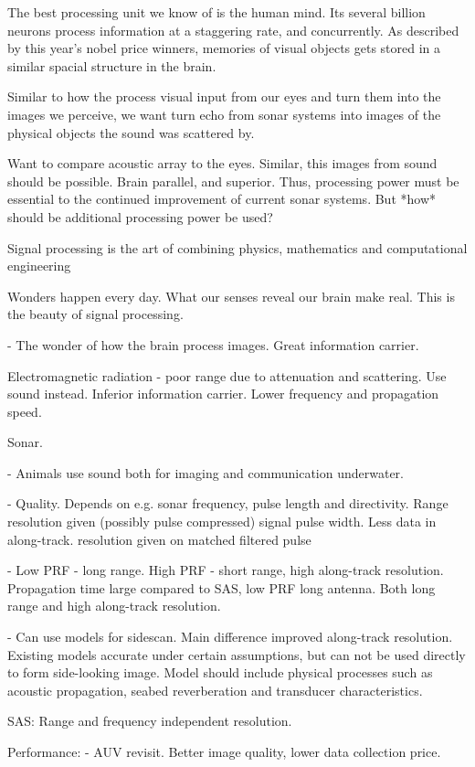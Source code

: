 
The best processing unit we know of is the human mind. Its several billion neurons process information at a staggering rate, and concurrently. As described by this year's nobel price winners, memories of visual objects gets stored in a similar spacial structure in the brain.  

Similar to how the process visual input from our eyes and turn them into the images we perceive, we want turn echo from sonar systems into images of the physical objects the sound was scattered by. 

Want to compare acoustic array to the eyes. Similar, this images from sound should be possible. Brain parallel, and superior. Thus, processing power must be essential to the continued improvement of current sonar systems. But *how* should be additional processing power be used?


Signal processing is the art of combining physics, mathematics and computational engineering 

Wonders happen every day. What our senses reveal our brain make real. This is the beauty of signal processing.

- The wonder of how the brain process images. Great information carrier.


Electromagnetic radiation - poor range due to attenuation and scattering. Use sound instead. Inferior information carrier. Lower frequency and propagation speed.

Sonar. 

- Animals use sound both for imaging and communication underwater.

- Quality. Depends on e.g. sonar frequency, pulse length and directivity. Range resolution given (possibly pulse compressed) signal pulse width. Less data in along-track. resolution given on matched filtered pulse 

- Low PRF - long range. High PRF - short range, high along-track resolution. Propagation time large compared to  SAS, low PRF long antenna. Both long range and high along-track resolution.

- Can use models for sidescan. Main difference improved along-track resolution. Existing models accurate under certain assumptions, but can not be used directly to form side-looking image. Model should include physical processes such as acoustic propagation, seabed reverberation and transducer characteristics.

SAS: Range and frequency independent resolution.


Performance:
- AUV revisit. Better image quality, lower data collection price.


